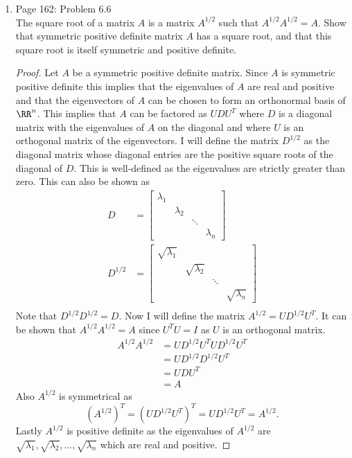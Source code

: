 \documentclass[11pt, oneside]{article}
\begin{document}
\begin{enumerate}
  \item %
    Page 162: Problem 6.6 \\
    The square root of a matrix $A$ is a matrix $A^{1/2}$ such that
    $A^{1/2} A^{1/2} = A$.
    Show that symmetric positive definite matrix $A$ has a square root, and that
    this square root is itself symmetric and positive definite.

    \begin{proof}
      Let $A$ be a symmetric positive definite matrix.
      Since $A$ is symmetric positive definite this implies that the
      eigenvalues of $A$ are real and positive and that the eigenvectors of
      $A$ can be chosen to form an orthonormal basis of $\RR^n$.
      This implies that $A$ can be factored as $UDU^T$ where $D$ is a diagonal
      matrix with the eigenvalues of $A$ on the diagonal and where $U$ is an
      orthogonal matrix of the eigenvectors.
      I will define the matrix $D^{1/2}$ as the diagonal matrix whose diagonal
      entries are the positive square roots of the diagonal of $D$.
      This is well-defined as the eigenvalues are strictly greater than zero.
      This can also be shown as
      \begin{align*}
        D &=
        \begin{bmatrix}
          \lambda_1 & & \\
           & \lambda_2 & & \\
           & & \ddots & \\
           & & & \lambda_n
        \end{bmatrix} \\
        D^{1/2} &= 
        \begin{bmatrix}
          \sqrt{\lambda_1} & & \\
           & \sqrt{\lambda_2} & & \\
           & & \ddots & \\
           & & & \sqrt{\lambda_n}
        \end{bmatrix} \\
      \end{align*}
      Note that $D^{1/2} D^{1/2} = D$.
      Now I will define the matrix $A^{1/2} = U D^{1/2} U^T$.
      It can be shown that $A^{1/2} A^{1/2} = A$ since $U^T U = I$ as $U$ is an
      orthogonal matrix.
      \begin{align*}
        A^{1/2} A^{1/2} &= U D^{1/2} U^TU D^{1/2} U^T \\
        &= U D^{1/2} D^{1/2} U^T \\
        &= U D U^T \\
        &= A
      \end{align*}
      Also $A^{1/2}$ is symmetrical as
      \[
        (A^{1/2})^T = (U D^{1/2} U^T)^T = U D^{1/2} U^T = A^{1/2}.
      \]
      Lastly $A^{1/2}$ is positive definite as the eigenvalues of $A^{1/2}$ are
      $\sqrt{\lambda_1}, \sqrt{\lambda_2}, \ldots, \sqrt{\lambda_n}$ which are
      real and positive.


\end{proof}
\end{enumerate}
\end{document}
